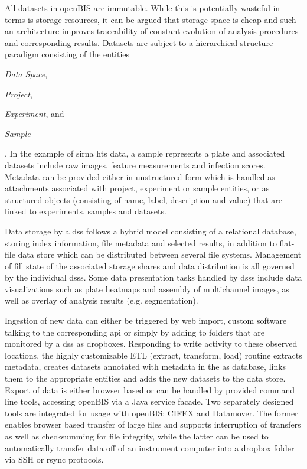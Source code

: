 All datasets in openBIS are immutable. While this is potentially wasteful in terms is storage resources, it can be argued that storage space is cheap and such an architecture improves traceability of constant evolution of analysis procedures and corresponding results. Datasets are subject to a hierarchical structure paradigm consisting of the entities \begin{enumerate*}[label=\itshape (\arabic*)] \item\textit{Data Space}, \item\textit{Project}, \item\textit{Experiment}, and \item\textit{Sample} \end{enumerate*}. In the example of \gls{sirna} \gls{hts} data, a sample represents a plate and associated datasets include raw images, feature measurements and infection scores. Metadata can be provided either in unstructured form which is handled as attachments associated with project, experiment or sample entities, or as structured objects (consisting of name, label, description and value) that are linked to experiments, samples and datasets.

Data storage by a \gls{dss} follows a hybrid model consisting of a relational database, storing index information, file metadata and selected results, in addition to flat-file data store which can be distributed between several file systems. Management of fill state of the associated storage shares and data distribution is all governed by the individual \glspl{dss}. Some data presentation tasks handled by \glspl{dss} include data visualizations such as plate heatmaps and assembly of multichannel images, as well as overlay of analysis results (e.g. segmentation).

Ingestion of new data can either be triggered by web import, custom software talking to the corresponding \gls{api} or simply by adding to folders that are monitored by a \gls{dss} as dropboxes. Responding to write activity to these observed locations, the highly customizable ETL (extract, transform, load) routine extracts metadata, creates datasets annotated with metadata in the \gls{as} database, links them to the appropriate entities and adds the new datasets to the data store. Export of data is either browser based or can be handled by provided command line tools, accessing openBIS via a Java service facade. Two separately designed tools are integrated for usage with openBIS: CIFEX and Datamover. The former enables browser based transfer of large files and supports interruption  of transfers as well as checksumming for file integrity, while the latter can be used to automatically transfer data off of an instrument computer into a dropbox folder via SSH or rsync protocols.

